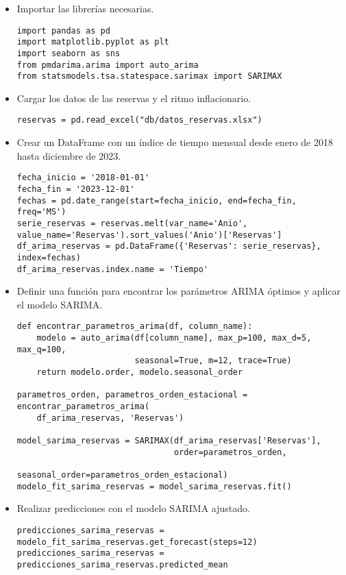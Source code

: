 \begin{itemize}\label{codigo sarima}
  \item Importar las librerías necesarias.
\begin{lstlisting}
import pandas as pd
import matplotlib.pyplot as plt
import seaborn as sns
from pmdarima.arima import auto_arima
from statsmodels.tsa.statespace.sarimax import SARIMAX
\end{lstlisting}

  \item Cargar los datos de las reservas y el ritmo inflacionario.
\begin{lstlisting}
reservas = pd.read_excel("db/datos_reservas.xlsx")
\end{lstlisting}

  \item Crear un DataFrame con un índice de tiempo mensual desde enero de 2018 hasta diciembre de 2023.
\begin{lstlisting}
fecha_inicio = '2018-01-01'
fecha_fin = '2023-12-01'
fechas = pd.date_range(start=fecha_inicio, end=fecha_fin, freq='MS')
serie_reservas = reservas.melt(var_name='Anio', value_name='Reservas').sort_values('Anio')['Reservas']
df_arima_reservas = pd.DataFrame({'Reservas': serie_reservas}, index=fechas)
df_arima_reservas.index.name = 'Tiempo'
\end{lstlisting}

  \item Definir una función para encontrar los parámetros ARIMA óptimos y aplicar el modelo SARIMA.
\begin{lstlisting}
def encontrar_parametros_arima(df, column_name):
    modelo = auto_arima(df[column_name], max_p=100, max_d=5, max_q=100, 
                        seasonal=True, m=12, trace=True)
    return modelo.order, modelo.seasonal_order

parametros_orden, parametros_orden_estacional = encontrar_parametros_arima(
    df_arima_reservas, 'Reservas')

model_sarima_reservas = SARIMAX(df_arima_reservas['Reservas'], 
                                order=parametros_orden, 
                                seasonal_order=parametros_orden_estacional)
modelo_fit_sarima_reservas = model_sarima_reservas.fit()
\end{lstlisting}

  \item Realizar predicciones con el modelo SARIMA ajustado.
\begin{lstlisting}
predicciones_sarima_reservas = modelo_fit_sarima_reservas.get_forecast(steps=12)
predicciones_sarima_reservas = predicciones_sarima_reservas.predicted_mean
\end{lstlisting}


\end{itemize}
